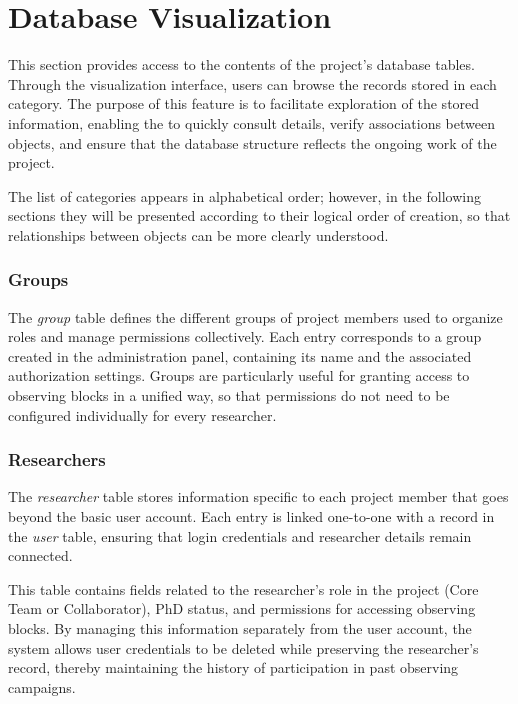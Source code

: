 
\chapter{Database Visualization} \label{chap:admin-database}

This section provides access to the contents of the project’s database tables. Through the visualization interface, users can browse the records stored in each category. The purpose of this feature is to facilitate exploration of the stored information, enabling the \admin to quickly consult details, verify associations between objects, and ensure that the database structure reflects the ongoing work of the project.


The list of categories appears in alphabetical order; however, in the following sections they will be presented according to their logical order of creation, so that relationships between objects can be more clearly understood.

\subsection{Groups}

The \textsl{group} table defines the different groups of project members used to organize roles and manage permissions collectively. Each entry corresponds to a group created in the administration panel, containing its name and the associated authorization settings. Groups are particularly useful for granting access to observing blocks in a unified way, so that permissions do not need to be configured individually for every researcher.


\subsection{Researchers}

The \textsl{researcher} table stores information specific to each project member that goes beyond the basic user account. Each entry is linked one-to-one with a record in the \textsl{user} table, ensuring that login credentials and researcher details remain connected.

This table contains fields related to the researcher’s role in the project (Core Team or Collaborator), PhD status, and permissions for accessing observing blocks. By managing this information separately from the user account, the system allows user credentials to be deleted while preserving the researcher’s record, thereby maintaining the history of participation in past observing campaigns.

